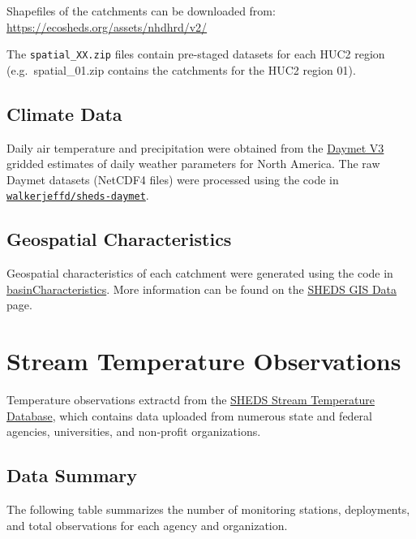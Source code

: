\documentclass[
]{book}
\begin{document}
Shapefiles of the catchments can be downloaded from: \url{https://ecosheds.org/assets/nhdhrd/v2/}

The \texttt{spatial\_XX.zip} files contain pre-staged datasets for each HUC2 region (e.g.~spatial\_01.zip contains the catchments for the HUC2 region 01).

\subsection{Climate Data}\label{climate-data}

Daily air temperature and precipitation were obtained from the \href{https://daymet.ornl.gov/}{Daymet V3} gridded estimates of daily weather parameters for North America. The raw Daymet datasets (NetCDF4 files) were processed using the code in \href{https://github.com/walkerjeffd/sheds-daymet}{\texttt{walkerjeffd/sheds-daymet}}.

\subsection{Geospatial Characteristics}\label{geospatial-characteristics}

Geospatial characteristics of each catchment were generated using the code in \href{https://github.com/Conte-Ecology/shedsGisData/tree/master/basinCharacteristics}{basinCharacteristics}. More information can be found on the \href{https://ecosheds.github.io/necd/}{SHEDS GIS Data} page.

\section{Stream Temperature Observations}\label{stream-temperature-observations}

Temperature observations extractd from the \href{http://db.ecosheds.org}{SHEDS Stream Temperature Database}, which contains data uploaded from numerous state and federal agencies, universities, and non-profit organizations.

\subsection{Data Summary}\label{data-summary}

The following table summarizes the number of monitoring stations, deployments, and total observations for each agency and organization.
\end{document}
